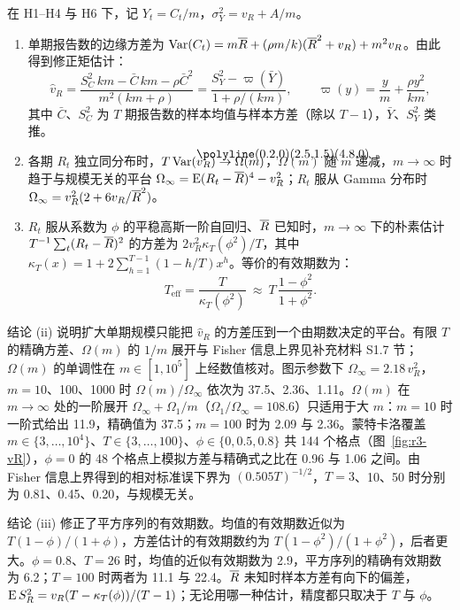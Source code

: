 \begin{proposition}[环境方差的估计精度]
\label{prop:vR-info}
在 H1--H4 与 H6 下，记 $Y_t=C_t/m$，$\sigma_Y^2=v_R+A/m$。
\begin{enumerate}[label=(\roman*)]
  \item 单期报告数的边缘方差为 $\operatorname{Var}(C_t)=m\overline{R}+(\rho m/k)(\overline{R}^2+v_R)+m^2v_R$。由此得到修正矩估计：
  \begin{equation}
    \hat v_R=\frac{S_C^2\,km-\bar C\,km-\rho\bar C^2}{m^2(km+\rho)}
    =\frac{S_Y^2-\varpi(\bar Y)}{1+\rho/(km)},\qquad \varpi(y)=\frac ym+\frac{\rho y^2}{km},
    \label{eq:r3-vhat}
  \end{equation}
  其中 $\bar C$、$S_C^2$ 为 $T$ 期报告数的样本均值与样本方差（除以 $T-1$），$\bar Y$、$S_Y^2$ 类推。
  \item 各期 $R_t$ 独立同分布时，$T\Var(\hat v_R)\to\Omega(m)$，$\Omega(m)$ 随 $m$ 递减，$m\to\infty$ 时趋于与规模无关的平台 $\Omega_\infty=\operatorname{E}(R_t-\overline{R})^4-v_R^2$；$R_t$ 服从 Gamma 分布时 $\Omega_\infty=v_R^2(2+6v_R/\overline{R}^2)$。
  \item $R_t$ 服从系数为 $\phi$ 的平稳高斯一阶自回归、$\overline{R}$ 已知时，$m\to\infty$ 下的朴素估计 $T^{-1}\sum_t(R_t-\overline{R})^2$ 的方差为 $2v_R^2\kappa_T(\phi^2)/T$，其中 $\kappa_T(x)=1+2\sum_{h=1}^{T-1}(1-h/T)x^h$。等价的有效期数为：
  \begin{equation}
    T_{\mathrm{eff}}=\frac{T}{\kappa_T(\phi^2)}\ \approx\ T\,\frac{1-\phi^2}{1+\phi^2}.
    \label{eq:r3-teff}
  \end{equation}
\end{enumerate}
\end{proposition}

结论 (ii) 说明扩大单期规模只能把 $\hat v_R$ 的方差压到一个由期数决定的平台。有限 $T$ 的精确方差、$\Omega(m)$ 的 $1/m$ 展开与 Fisher 信息上界见补充材料 S1.7 节；$\Omega(m)$ 的单调性在 $m\in[1,10^5]$ 上经数值核对。图示参数下 $\Omega_\infty=2.18\,v_R^2$，$m=10$、100、1000 时 $\Omega(m)/\Omega_\infty$ 依次为 37.5、2.36、1.11。$\Omega(m)$ 在 $m\to\infty$ 处的一阶展开 $\Omega_\infty+\Omega_1/m$（$\Omega_1/\Omega_\infty=108.6$）只适用于大 $m$：$m=10$ 时一阶式给出 11.9，精确值为 37.5；$m=100$ 时为 2.09 与 2.36。蒙特卡洛覆盖 $m\in\{3,\dots,10^4\}$、$T\in\{3,\dots,100\}$、$\phi\in\{0,0.5,0.8\}$ 共 144 个格点（图~\ref{fig:r3-vR}），$\phi=0$ 的 48 个格点上模拟方差与精确式之比在 0.96 与 1.06 之间。由 Fisher 信息上界得到的相对标准误下界为 $(0.505T)^{-1/2}$，$T=3$、10、50 时分别为 0.81、0.45、0.20，与规模无关。

结论 (iii) 修正了平方序列的有效期数。均值的有效期数近似为 $T(1-\phi)/(1+\phi)$，方差估计的有效期数约为 $T(1-\phi^2)/(1+\phi^2)$，后者更大。$\phi=0.8$、$T=26$ 时，均值的近似有效期数为 2.9，平方序列的精确有效期数为 6.2；$T=100$ 时两者为 11.1 与 22.4。$\overline{R}$ 未知时样本方差有向下的偏差，$\operatorname{E} S_R^2=v_R(T-\kappa_T(\phi))/(T-1)$；无论用哪一种估计，精度都只取决于 $T$ 与 $\phi$。

